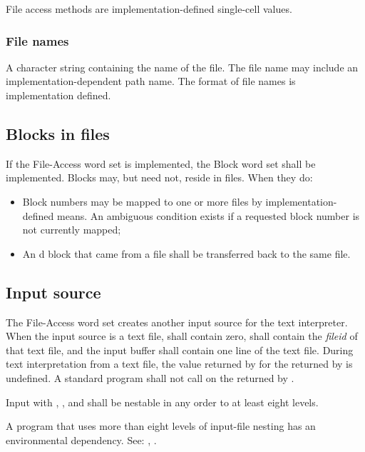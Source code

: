 File access methods are implementation-defined single-cell
values.

\subsubsection{File names} %
\label{file:names}

A character string containing the name of the file. The file name
may include an implementation-dependent path name. The format of
file names is implementation defined.

\subsection{Blocks in files} %
\label{file:blocks}

If the File-Access word set is implemented, the Block word set
shall be implemented. Blocks may, but need not, reside in files.
When they do:
\begin{itemize}
\item Block numbers may be mapped to one or more files by
	implementation-defined means. An ambiguous condition exists
	if a requested block number is not currently mapped;
\item An d block that came from a file shall
	be transferred back to the same file.
\end{itemize}


\subsection{Input source} %
\label{file:source}

The File-Access word set creates another input source for the text
interpreter. When the input source is a text file, 
shall contain zero,  shall contain the \emph{fileid}
of that text file, and the input buffer shall contain one line of
the text file.  During text interpretation from a text file, the
value returned by  for the  returned
by  is undefined.  A standard program
shall not call  on the  returned
by .

Input with , , 
and  shall be nestable in any order to at least
eight levels.

A program that uses more than eight levels of input-file nesting has
an environmental dependency. See:
,
.

